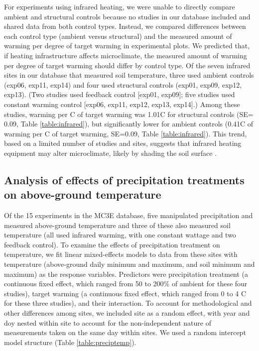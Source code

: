 \documentclass{article}
\begin{document}
\par For experiments using infrared heating, we were unable to directly compare ambient and structural controls because no studies in our database included and shared data from both control types. Instead, we compared differences between each control type (ambient versus structural) and the measured amount of warming per degree of target warming in experimental plots. We predicted that, if heating infrastructure affects microclimate, the measured amount of warming per degree of target warming should differ by control type. Of the seven infrared sites in our database that measured soil temperature, three used ambient controls (exp06, exp11, exp14) and four used structural controls (exp01, exp09, exp12, exp13). (Two studies used feedback control [exp01, exp09]; five studies used constant warming control [exp06, exp11, exp12, exp13, exp14].) Among these studies, warming per \degree C of target warming was 1.01\degree C for structural controls (SE= 0.09, Table  \ref{table:infrared}), but significantly lower for ambient controls (0.41\degree C of warming per \degree C of target warming, SE=0.09, Table \ref{table:infrared}). This trend, based on a limited number of studies and sites, suggests that infrared heating equipment may alter microclimate, likely by shading the soil surface \citep{mcdaniel2014}.  

\subsection* {Analysis of effects of precipitation treatments on above-ground temperature}
Of the 15 experiments in the MC3E database, five manipulated precipitation and measured above-ground temperature and three of these also measured soil temperature (all used infrared warming, with one constant wattage and two feedback control). To examine the effects of precipitation treatment on temperature, we fit linear mixed-effects models to data from these sites with temperature (above-ground daily minimum and maximum, and soil minimum and maximum) as the response variables. Predictors were precipitation treatment (a continuous fixed effect, which ranged from 50 to 200\% of ambient for these four studies), target warming (a continuous fixed effect, which ranged from 0 to 4 \degree C for these three studies), and their interaction. To account for methodological and other differences among sites, we included site as a random effect, with year and doy nested within site to account for the non-independent nature of measurements taken on the same day within sites. We used a random intercept model structure (Table \ref{table:preciptemp}). 
\end{document}
